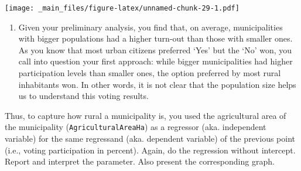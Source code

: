 \documentclass[
]{book}
\newenvironment{Shaded}{\begin{snugshade}}{\end{snugshade}}
\newcommand{\AttributeTok}[1]{\textcolor[rgb]{0.13,0.29,0.53}{#1}}
\newcommand{\CommentTok}[1]{\textcolor[rgb]{0.56,0.35,0.01}{\textit{#1}}}
\newcommand{\ConstantTok}[1]{\textcolor[rgb]{0.56,0.35,0.01}{#1}}
\newcommand{\DecValTok}[1]{\textcolor[rgb]{0.00,0.00,0.81}{#1}}
\newcommand{\FunctionTok}[1]{\textcolor[rgb]{0.13,0.29,0.53}{\textbf{#1}}}
\newcommand{\NormalTok}[1]{#1}
\newcommand{\SpecialCharTok}[1]{\textcolor[rgb]{0.81,0.36,0.00}{\textbf{#1}}}
\newcommand{\StringTok}[1]{\textcolor[rgb]{0.31,0.60,0.02}{#1}}
\providecommand{\tightlist}{%
  \setlength{\itemsep}{0pt}\setlength{\parskip}{0pt}}
\begin{document}
\begin{Shaded}
\end{Shaded}

\texttt{[image: \_main\_files/figure-latex/unnamed-chunk-29-1.pdf]}

\begin{enumerate}
\def\labelenumi{\roman{enumi}.}
\tightlist
\item
  Given your preliminary analysis, you find that, on average, municipalities with bigger populations had a higher turn-out than those with smaller ones. As you know that most urban citizens preferred `Yes' but the `No' won, you call into question your first approach: while bigger municipalities had higher participation levels than smaller ones, the option preferred by most rural inhabitants won. In other words, it is not clear that the population size helps us to understand this voting results.
\end{enumerate}

Thus, to capture how rural a municipality is, you used the agricultural area of the municipality (\texttt{AgriculturalAreaHa}) as a regressor (aka. independent variable) for the same regressand (aka. dependent variable) of the previous point (i.e., voting participation in percent). Again, do the regression without intercept. Report and interpret the parameter. Also present the corresponding graph.
\end{document}
